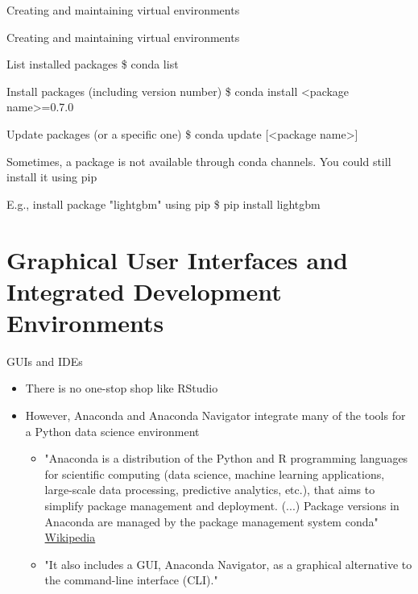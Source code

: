 \documentclass[10pt, aspectratio=169]{beamer}
\newcommand{\cemph}[1]{\textcolor{mzescyan}{#1}}
\begin{document}
{\begin{frame}{Creating and maintaining virtual environments}
  \end{frame}

       	\begin{frame}{Creating and maintaining virtual environments}
\small          
 \begin{block}{List installed packages}
                   \$ conda list

		          \end{block} 
            
                 \begin{block}{Install packages (including version number)}
                   \$ conda install <package name>=0.7.0
		          \end{block} \begin{block}{Update packages (or a specific one)}
                   \$ conda update [<package name>]
		          \end{block}
             Sometimes, a package is not available through \cemph{conda} channels. You could still install it using \cemph{pip}
              \begin{block}{E.g., install package "lightgbm" using pip}
                   \$ pip install lightgbm
		          \end{block}

  \end{frame}


	
	\section{Graphical User Interfaces and Integrated Development Environments}

 
	\begin{frame}{GUIs and IDEs}
		\begin{itemize}
		    \item There is no one-stop shop like RStudio
            \item However, \cemph{Anaconda} and \cemph{Anaconda Navigator} integrate many of the tools for  a Python data science environment
            \begin{itemize}
                \item "Anaconda is a distribution of the Python and R programming languages for scientific computing (data science, machine learning applications, large-scale data processing, predictive analytics, etc.), that aims to simplify package management and deployment. (...) Package versions in Anaconda are managed by the package management system conda" \href{https://en.wikipedia.org/wiki/Anaconda_(Python_distribution)}{Wikipedia}
                \item "It also includes a GUI, Anaconda Navigator, as a graphical alternative to the command-line interface (CLI)."
            \end{itemize}
		\end{itemize}
	\end{frame}

}
\end{document}
